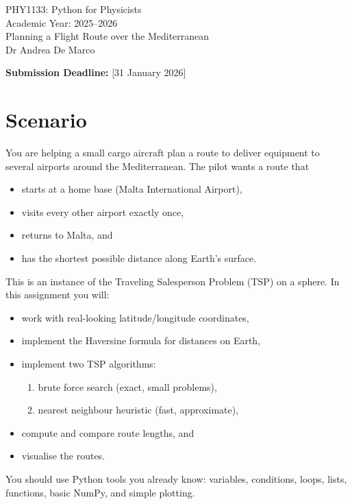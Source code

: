 \documentclass[11pt]{article}
\begin{document}
\begin{center}
    {\large PHY1133: Python for Physicists}\\[0.5em]
    {\large Academic Year: 2025--2026}\\[0.5em]
    {\Large Planning a Flight Route over the Mediterranean}\\[0.5em]
    {\large Dr Andrea De Marco}\\[0.5em]
\end{center}
\noindent\textbf{Submission Deadline:} [31 January 2026]\\[0.5em]

\section{Scenario}
You are helping a small cargo aircraft plan a route to deliver equipment to several airports around the Mediterranean. The pilot wants a route that
\begin{itemize}
    \item starts at a home base (Malta International Airport),
    \item visits every other airport exactly once,
    \item returns to Malta, and
    \item has the shortest possible distance along Earth's surface.
\end{itemize}

This is an instance of the Traveling Salesperson Problem (TSP) on a sphere. In this assignment you will:
\begin{itemize}
    \item work with real-looking latitude/longitude coordinates,
    \item implement the Haversine formula for distances on Earth,
    \item implement two TSP algorithms:
    \begin{enumerate}
        \item brute force search (exact, small problems),
        \item nearest neighbour heuristic (fast, approximate),
    \end{enumerate}
    \item compute and compare route lengths, and
    \item visualise the routes.
\end{itemize}

You should use Python tools you already know: variables, conditions, loops, lists, functions, basic NumPy, and simple plotting.
\end{document}
